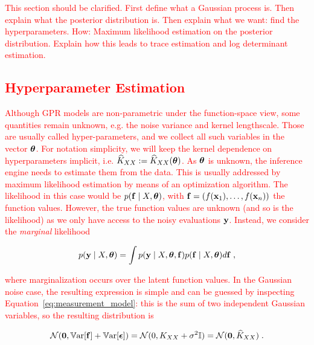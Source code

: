 \documentclass{article}
\begin{document}
\textcolor{red}{This section should be clarified. First define what a Gaussian process is. Then explain what the posterior distribution is. Then explain what we want: find the hyperparameters. How: Maximum likelihood estimation on the posterior distribution. Explain how this leads to trace estimation and log determinant estimation.

\subsection{Hyperparameter Estimation}

Although GPR models are non-parametric under the function-space view, some quantities remain unknown, e.g. the noise variance and kernel lengthscale. Those are usually called hyper-parameters, and we collect all such variables in the vector $\boldsymbol{\mathbf{\theta}}$. For notation simplicity, we will keep the kernel dependence on hyperparameters implicit, i.e. $\widehat K_{XX} := \widehat K_{XX}(\boldsymbol{\mathbf{\theta}})$. 
As $\boldsymbol{\mathbf{\theta}}$ is unknown, the inference engine needs to estimate them from the data. This is usually addressed by maximum likelihood estimation by means of an optimization algorithm. The likelihood in this case would be $p(\boldsymbol{\mathbf{f}} \mid X, \boldsymbol{\mathbf{\theta}})$, with $\boldsymbol{\mathbf{f}} = (f(\boldsymbol{\mathbf{x}}_1), \ldots, f(\boldsymbol{\mathbf{x}}_n))$ the function values. However, the true function values are unknown (and so is the likelihood) as we only have access to the noisy evaluations $\boldsymbol{\mathbf{y}}$. Instead, we consider the \emph{marginal} likelihood

\begin{equation*}
    p( \boldsymbol{\mathbf{y}} \mid X, \boldsymbol{\mathbf{\theta}}) = \int p( \boldsymbol{\mathbf{y}} \mid X, \boldsymbol{\mathbf{\theta}}, \boldsymbol{\mathbf{f}}) p(\boldsymbol{\mathbf{f}} \mid X, \boldsymbol{\mathbf{\theta}}) d \boldsymbol{\mathbf{f}} \; ,
\end{equation*}

where marginalization occurs over the latent function values. 
In the Gaussian noise case, the resulting expression is simple and can be guessed by inspecting Equation~\eqref{eq:measurement_model}: this is the sum of two independent Gaussian variables, so the resulting distribution is

\begin{equation*}
    \mathcal N(\vect 0, \Var[\vect f] + \Var[\vect \epsilon]) = \mathcal N(0, K_{XX} + \sigma^2 \Id ) = \mathcal N(\vect 0, \widehat K_{XX}) \; .
\end{equation*}

}
\end{document}
